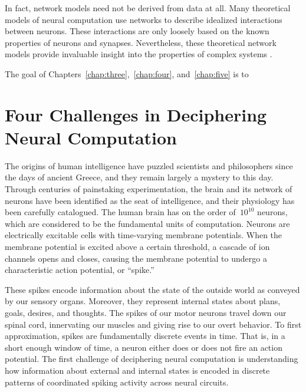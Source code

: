 In fact, network models need not be derived from data at all.  Many
theoretical models of neural computation use networks to describe
idealized interactions between neurons. These interactions are only
loosely based on the known properties of neurons and
synapses. Nevertheless, these theoretical network models provide
invaluable insight into the properties of complex systems
\cite{hopfield1982neural, amit1992modeling, van1996chaos, DayanAbbott,
  sussillo2009generating}.



The goal of Chapters~\ref{chap:three},~\ref{chap:four},
and~\ref{chap:five} is to 


\section{Four Challenges in Deciphering Neural Computation}
The origins of human intelligence have puzzled scientists and
philosophers since the days of ancient Greece, and they remain largely
a mystery to this day. Through centuries of painstaking
experimentation, the brain and its network of neurons have been
identified as the seat of intelligence, and their physiology has been
carefully catalogued. The human brain has on the order
of~$\text{10}^{\text{10}}$ neurons, which are considered to be the
fundamental units of computation. Neurons are electrically excitable
cells with time-varying membrane potentials. When the membrane
potential is excited above a certain threshold, a cascade of ion
channels opens and closes, causing the membrane potential to undergo a
characteristic action potential, or ``spike.''

These spikes encode information about the state of the outside world
as conveyed by our sensory organs. Moreover, they represent internal
states about plans, goals, desires, and thoughts. The spikes of our
motor neurons travel down our spinal cord, innervating our muscles and
giving rise to our overt behavior. To first approximation, spikes are
fundamentally discrete events in time.  That is, in a short enough
window of time, a neuron either does or does not fire an action
potential.  The first challenge of deciphering neural computation is
understanding how information about external and internal states is
encoded in discrete patterns of coordinated spiking activity across
neural circuits.

